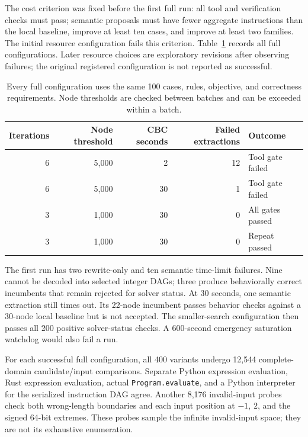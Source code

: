 \documentclass[11pt]{article}
\begin{document}
The cost criterion was fixed before the first full run: all tool and
verification checks must pass; semantic proposals must have fewer aggregate
instructions than the local baseline, improve at least ten cases, and improve
at least two families. The initial resource configuration fails this criterion.
Table~\ref{tab:configs} records all full configurations. Later resource choices
are exploratory revisions after observing failures; the original registered
configuration is not reported as successful.

\begin{table}[ht]
\centering
\begin{tabular}{rrrrl}
\toprule
Iterations & Node threshold & CBC seconds & Failed extractions & Outcome\\
\midrule
6 & 5,000 & 2 & 12 & Tool gate failed\\
6 & 5,000 & 30 & 1 & Tool gate failed\\
3 & 1,000 & 30 & 0 & All gates passed\\
3 & 1,000 & 30 & 0 & Repeat passed\\
\bottomrule
\end{tabular}
\caption{Every full configuration uses the same 100 cases, rules, objective,
and correctness requirements. Node thresholds are checked between batches and
can be exceeded within a batch.}
\label{tab:configs}
\end{table}

The first run has two rewrite-only and ten semantic time-limit failures.
Nine cannot be decoded into selected integer DAGs; three produce behaviorally
correct incumbents that remain rejected for solver status. At 30 seconds, one
semantic extraction still times out. Its 22-node incumbent passes behavior
checks against a 30-node local baseline but is not accepted. The smaller-search
configuration then passes all 200 positive solver-status checks. A
600-second emergency saturation watchdog would also fail a run.

For each successful full configuration, all 400 variants undergo 12,544
complete-domain candidate/input comparisons. Separate Python expression
evaluation, Rust expression evaluation, actual \texttt{Program.evaluate}, and a
Python interpreter for the serialized instruction DAG agree. Another 8,176
invalid-input probes check both wrong-length boundaries and each input position
at $-1$, $2$, and the signed 64-bit extremes. These probes sample the infinite
invalid-input space; they are not its exhaustive enumeration.
\end{document}
